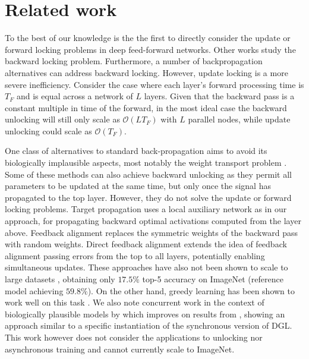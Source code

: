 \documentclass{article}
\begin{document}
\section{Related work}\label{sec:rel}

To the best of our knowledge \citep{jaderberg2016decoupled} is the the first to directly consider the update or forward locking problems in deep feed-forward networks. Other works \citep{Huo2018,ddg} study the backward locking problem. Furthermore, a number of backpropagation alternatives \citep{choromanska2018beyond,dtargetProp,direct_feedback} 
can address backward locking. However, update locking is a more severe inefficiency. Consider the case where each layer's forward processing time is $T_F$ and is equal across a network of $L$ layers.  
Given that the backward pass is a constant multiple in time of the forward, in the most ideal case the backward unlocking will still only scale as $\mathcal{O}(LT_F)$ with $L$ parallel nodes, while update unlocking could scale as $\mathcal{O}(T_F)$.


One class of alternatives to standard back-propagation aims to avoid its biologically implausible aspects, most notably the weight transport problem \citep{bartunov2018assessing,direct_feedback,feedback_alignment,dtargetProp}. Some of these methods \citep{dtargetProp,direct_feedback} can also achieve backward unlocking as they permit all parameters to be updated at the same time, but only once the signal has propagated to the top layer. 
However, they do not solve the update or forward locking problems. Target propagation uses a local auxiliary network as in our approach, for propagating backward optimal activations computed from the layer above.  Feedback alignment replaces the symmetric weights of the backward pass with random weights. Direct feedback alignment extends the idea of feedback alignment passing errors from the top to all layers, potentially enabling simultaneous updates. These approaches have also not been shown to scale to large datasets \citep{bartunov2018assessing}, obtaining only $17.5\%$ top-5 accuracy on ImageNet (reference model achieving $59.8\%$). On the other hand, greedy learning  has been shown to work well on this task \citep{shallow}. We also note concurrent work in the context of biologically plausible models by \citep{nokland2019training} which improves on results from \cite{mostafa2018deep}, showing an approach similar to a specific instantiation of the synchronous version of DGL. This work however does not consider the applications to unlocking nor asynchronous training and cannot currently scale to ImageNet.
\end{document}
